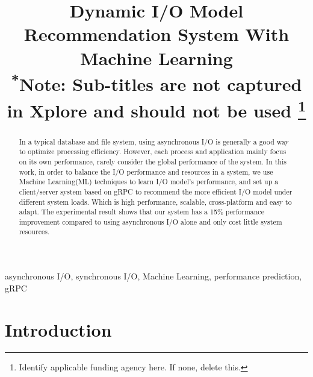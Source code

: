 \documentclass[conference]{IEEEtran}
\begin{document}
\title{Dynamic I/O Model Recommendation System With Machine Learning\\
{\footnotesize \textsuperscript{*}Note: Sub-titles are not captured in Xplore and
should not be used}
\thanks{Identify applicable funding agency here. If none, delete this.}
}

\author{
	\and
}

\maketitle

\begin{abstract}
	In a typical database and file system, using asynchronous I/O is generally a good way to optimize processing efficiency.
	However, each process and application mainly focus on its own performance, rarely consider the global performance of the system.
	In this work, in order to balance the I/O performance and resources in a system, we use Machine Learning(ML) techniques to learn I/O model's performance,
	and set up a client/server system based on gRPC to recommend the more efficient I/O model under different system loads. Which is high performance, scalable, cross-platform and easy to adapt.
	The experimental result shows that our system has a 15\% performance improvement compared to using asynchronous I/O alone and only cost little system resources.

\end{abstract}

\renewcommand\IEEEkeywordsname{Keywords}
\begin{IEEEkeywords}
	asynchronous I/O, synchronous I/O, Machine Learning, performance prediction, gRPC
\end{IEEEkeywords}

\section{Introduction}
\end{document}
